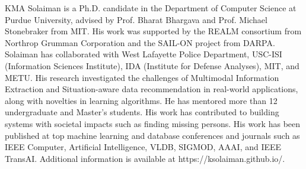 \noindent {}
KMA Solaiman is a Ph.D. candidate in the Department of Computer Science at Purdue University, advised by Prof. Bharat Bhargava and Prof. Michael Stonebraker from MIT. His work was supported by the REALM consortium from Northrop Grumman Corporation and the SAIL-ON project from DARPA. Solaiman has collaborated with West Lafayette Police Department, USC-ISI (Information Sciences Institute), IDA (Institute for Defense Analyses), MIT, and METU. His research investigated the challenges of Multimodal Information Extraction and Situation-aware data recommendation in real-world applications, along with novelties in learning algorithms. He has mentored more than 12 undergraduate and Master’s students. His work has contributed to building systems with societal impacts such as finding missing persons. His work has been published at top machine learning and database conferences and journals such as IEEE Computer, Artificial Intelligence, VLDB, SIGMOD, AAAI, and IEEE TransAI. Additional information is available at https://ksolaiman.github.io/.